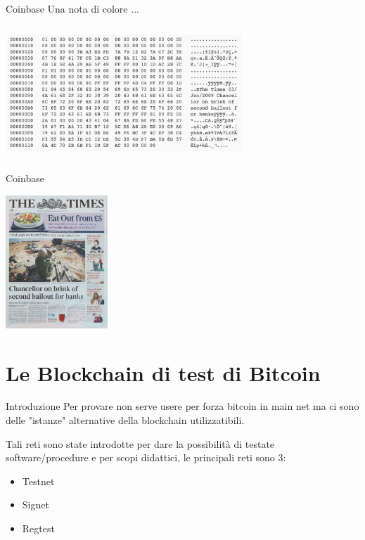 \documentclass[aspectratio=169]{beamer}
\begin{document}
\begin{frame}{Coinbase}
    Una nota di colore ...
    \begin{center}
        \includegraphics[height=5cm]{raw.jpg}
    \end{center}
\end{frame}

\begin{frame}{Coinbase}
    \begin{center}
        \includegraphics[height=5cm]{times.png}
    \end{center}
\end{frame}

\section{Le Blockchain di test di Bitcoin}

\begin{frame}{Introduzione}
    Per provare non serve usere per forza bitcoin in main net ma ci sono delle "istanze" alternative della blockchain utilizzatibili.

    Tali reti sono state introdotte per dare la possibilità di testate software/procedure e per scopi didattici, le principali reti sono 3:
    \begin{itemize}
        \item Testnet
        \item Signet
        \item Regtest
    \end{itemize}


\end{frame}
\end{document}
